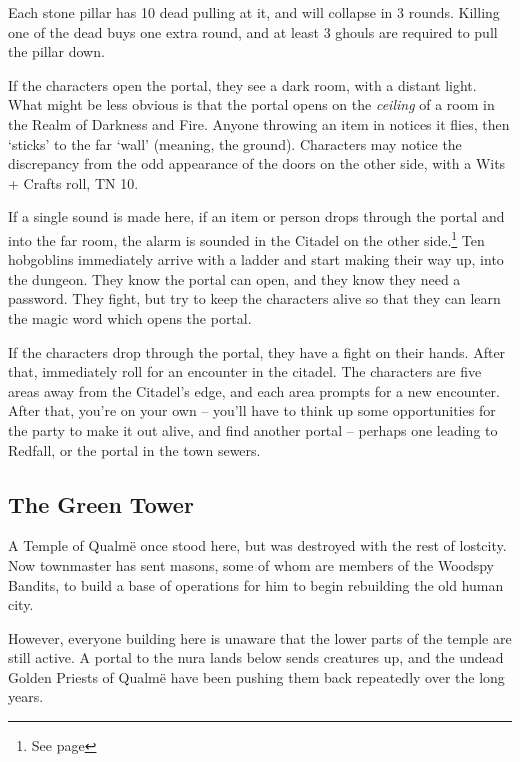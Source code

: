 \begin{multicols}{2}
Each stone pillar has 10 dead pulling at it, and will collapse in 3 rounds.  Killing one of the dead buys one extra round, and at least 3 ghouls are required to pull the pillar down.

If the characters open the portal, they see a dark room, with a distant light.  What might be less obvious is that the portal opens on the \emph{ceiling} of a room in the Realm of Darkness and Fire.  Anyone throwing an item in notices it flies, then `sticks' to the far `wall' (meaning, the ground).  Characters may notice the discrepancy from the odd appearance of the doors on the other side, with a Wits + Crafts roll, TN 10.

If a single sound is made here, if an item or person drops through the portal and into the far room, the alarm is sounded in the Citadel on the other side.\footnote{See page \pageref{darknessandfire}}
Ten hobgoblins immediately arrive with a ladder and start making their way up, into the dungeon.
They know the portal can open, and they know they need a password.
They fight, but try to keep the characters alive so that they can learn the magic word which opens the portal.

If the characters drop through the portal, they have a fight on their hands.  After that, immediately roll for an encounter in the citadel.  The characters are five areas away from the Citadel's edge, and each area prompts for a new encounter.  After that, you're on your own -- you'll have to think up some opportunities for the party to make it out alive, and find another portal -- perhaps one leading to Redfall, or the portal in the town sewers.

\subsection{The Green Tower}\label{green_tower}\setcounter{list}{0}

\begin{figure*}[t]

\label{green_tower_map}

\end{figure*}

A Temple of Qualm\"{e} once stood here, but was destroyed with the rest of \gls{lostcity}.
Now \gls{townmaster} has sent masons, some of whom are members of the Woodspy Bandits, to build a base of operations for him to begin rebuilding the old human city.

However, everyone building here is unaware that the lower parts of the temple are still active.
A portal to the nura lands below sends creatures up, and the undead Golden Priests of Qualm\"{e} have been pushing them back repeatedly over the long years.


\end{multicols}

